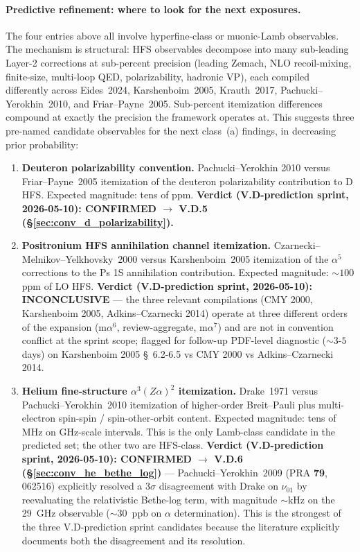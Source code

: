 \documentclass[11pt]{article}
\begin{document}
\paragraph{Predictive refinement: where to look for the next
exposures.} %
The four entries above all involve hyperfine-class or muonic-Lamb
observables.  The mechanism is structural: HFS observables decompose
into many sub-leading Layer-2 corrections at sub-percent precision
(leading Zemach, NLO recoil-mixing, finite-size, multi-loop QED,
polarizability, hadronic VP), each compiled differently across
Eides~2024, Karshenboim~2005, Krauth~2017, Pachucki--Yerokhin~2010,
and Friar--Payne~2005.  Sub-percent itemization differences
compound at exactly the precision the framework operates at.  This
suggests three pre-named candidate observables for the next
class~(a) findings, in decreasing prior probability:
\begin{enumerate}\setlength\itemsep{0pt}
\item \textbf{Deuteron polarizability convention.}  Pachucki--Yerokhin
2010 versus Friar--Payne~2005 itemization of the deuteron
polarizability contribution to D HFS.  Expected magnitude: tens of
ppm.  \textbf{Verdict (V.D-prediction sprint, 2026-05-10):
CONFIRMED $\to$ V.D.5 (\S\ref{sec:conv_d_polarizability}).}
\item \textbf{Positronium HFS annihilation channel itemization.}
Czarnecki--Melnikov--Yelkhovsky~2000 versus Karshenboim~2005
itemization of the $\alpha^5$ corrections to the Ps 1S annihilation
contribution.  Expected magnitude: $\sim 100$ ppm of LO HFS.
\textbf{Verdict (V.D-prediction sprint, 2026-05-10): INCONCLUSIVE} ---
the three relevant compilations (CMY 2000, Karshenboim 2005,
Adkins--Czarnecki 2014) operate at three different orders of the
expansion (m$\alpha^6$, review-aggregate, m$\alpha^7$) and are not
in convention conflict at the sprint scope; flagged for follow-up
PDF-level diagnostic ($\sim 3$-$5$ days) on Karshenboim 2005 \S~6.2-6.5
vs CMY 2000 vs Adkins--Czarnecki 2014.
\item \textbf{Helium fine-structure $\alpha^3 (Z\alpha)^2$
itemization.}  Drake~1971 versus Pachucki--Yerokhin~2010
itemization of higher-order Breit--Pauli plus multi-electron
spin-spin / spin-other-orbit content.  Expected magnitude: tens of
MHz on GHz-scale intervals.  This is the only Lamb-class candidate
in the predicted set; the other two are HFS-class.
\textbf{Verdict (V.D-prediction sprint, 2026-05-10): CONFIRMED $\to$
V.D.6 (\S\ref{sec:conv_he_bethe_log})} --- Pachucki--Yerokhin~2009
(PRA \textbf{79}, 062516) explicitly resolved a 3$\sigma$ disagreement
with Drake on $\nu_{01}$ by reevaluating the relativistic Bethe-log
term, with magnitude $\sim$kHz on the 29~GHz observable
($\sim 30$~ppb on $\alpha$ determination).  This is the strongest of
the three V.D-prediction sprint candidates because the literature
explicitly documents both the disagreement and its resolution.
\end{enumerate}
\end{document}
